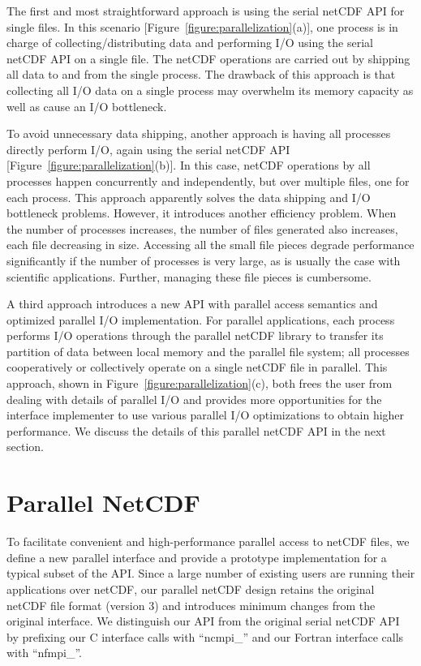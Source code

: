 \documentclass[10pt,twocolumn]{article}          %
\begin{document}
The first and most straightforward approach is using the serial netCDF API for single files. In
this scenario [Figure~\ref{figure:parallelization}(a)], one process is in charge of
collecting/distributing data and performing I/O using the serial netCDF API on a single file. The
netCDF operations are carried out by shipping all data to and from the single process. The drawback
of this approach is that collecting all I/O data on a single process may overwhelm its memory
capacity as well as cause an I/O bottleneck.

To avoid unnecessary data shipping, another approach is
having all processes directly perform I/O, again using the serial
netCDF API [Figure~\ref{figure:parallelization}(b)]. In this case,
netCDF operations by all processes happen concurrently and
independently, but over multiple files, one for each process. This
approach apparently solves the data shipping and I/O bottleneck
problems. However, it introduces another efficiency problem. When
the number of processes increases, the number of files generated
also increases, each file decreasing in size. Accessing all the
small file pieces degrade performance
significantly if the number of processes is very large, as is
usually the case with scientific applications. Further, managing these
file pieces is cumbersome. 

A
third approach introduces a new API with parallel access semantics and optimized parallel I/O
implementation. For parallel applications, each process performs I/O operations through the
parallel netCDF library to transfer its partition of data between local memory and the parallel
file system; all processes cooperatively or collectively operate on a single netCDF file in
parallel. This approach, shown in Figure~\ref{figure:parallelization}(c), both frees the user from
dealing with details of parallel I/O and provides more opportunities for the interface implementer
to use various parallel I/O optimizations to obtain higher performance. We discuss the details
of this parallel netCDF API in the next section.

\section{Parallel NetCDF}

To facilitate convenient and high-performance parallel access to netCDF files, we define a
new parallel interface and provide a prototype implementation for a typical subset of the API.
Since a large number of existing users are running their applications over netCDF, our
parallel netCDF design retains the original netCDF file format (version 3) and introduces minimum
changes from the original interface.  We distinguish our API
from the original serial netCDF API by prefixing our C interface calls with ``ncmpi\_'' and our
Fortran interface calls with ``nfmpi\_''.
\end{document}
